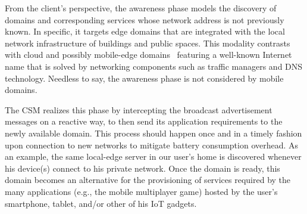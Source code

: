 From the client's perspective, the awareness phase models the discovery of domains and corresponding services whose network address is not previously known. In specific, it targets edge domains that are integrated with the local network infrastructure of buildings and public spaces. This modality contrasts with cloud and possibly mobile-edge domains~\cite{ahmed2016isco} featuring a well-known Internet name that is solved by networking components such as traffic managers and DNS technology. Needless to say, the awareness phase is not considered by mobile domains.

The CSM realizes this phase by intercepting the broadcast advertisement messages on a reactive way, to then send its application requirements to the newly available domain.
This process should happen once and in a timely fashion upon connection to new networks to mitigate battery consumption overhead. As an example, the same local-edge server in our user's home is discovered whenever his device(s) connect to his private network. Once the domain is ready, this domain becomes an alternative for the provisioning of services required by the many applications (e.g., the mobile multiplayer game) hosted by the user's smartphone, tablet, and/or other of his IoT gadgets. 






%


%
%
	

